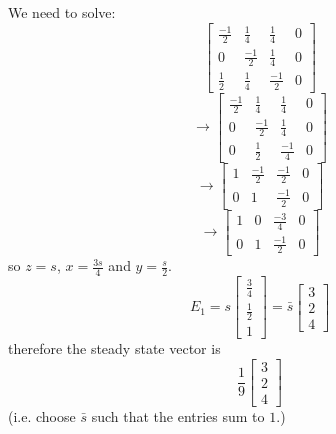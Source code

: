 \documentclass{article}
\begin{document}
\begin{Answer}
We need to solve:
  \begin{equation*}
  \left[
  \begin{array}{ccc|c}
  \frac{-1}{2} & \frac{1}{4} & \frac{1}{4}&0\\
  0 & \frac{-1}{2} & \frac{1}{4}&0\\
  \frac{1}{2} & \frac{1}{4} & \frac{-1}{2}&0
  \end{array}
  \right]
  \end{equation*}
  \begin{equation*}
  \rightarrow\left[
  \begin{array}{ccc|c}
  \frac{-1}{2} & \frac{1}{4} & \frac{1}{4}&0\\
  0 & \frac{-1}{2} & \frac{1}{4}&0\\
  0 & \frac{1}{2} & \frac{-1}{4}&0
  \end{array}
  \right]
  \end{equation*}
  \begin{equation*}
  \rightarrow\left[
  \begin{array}{ccc|c}
  1 & \frac{-1}{2} & \frac{-1}{2}&0\\
  0 & 1 & \frac{-1}{2}&0
  \end{array}
  \right]
  \end{equation*}
  \begin{equation*}
  \rightarrow\left[
  \begin{array}{ccc|c}
  1 & 0 & \frac{-3}{4}&0\\
  0 & 1 & \frac{-1}{2}&0
  \end{array}
  \right]
  \end{equation*}
  so $z = s$, $x = \frac{3s}{4}$ and $y = \frac{s}{2}$.
  \begin{equation*}
  E_1 = s \left[
  \begin{array}{c}
  \frac{3}{4}\\
  \frac{1}{2}\\
  1
  \end{array}
  \right] = \bar{s} \left[
  \begin{array}{c}
  3\\
  2\\
  4
  \end{array}
  \right]
  \end{equation*}
  therefore the steady state vector is
  \begin{equation*}
  \frac{1}{9} \left[
  \begin{array}{c}
  3\\
  2\\
  4
  \end{array}
  \right]
  \end{equation*}
  (i.e. choose $\bar{s}$ such that the entries sum to $1$.)
\end{Answer}

\shipoutAnswer



\end{document}
